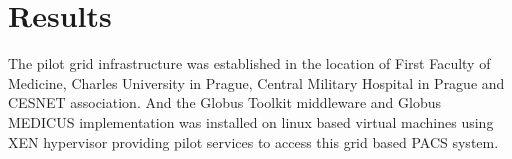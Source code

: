 \section{Results}
\label{sec:resultsimages}
The pilot grid infrastructure was established in the location of First Faculty of Medicine, Charles University in Prague, Central Military Hospital in Prague and CESNET association. And the Globus Toolkit middleware and Globus MEDICUS implementation was installed on linux based virtual machines using XEN hypervisor providing pilot services to access this grid based PACS system.

